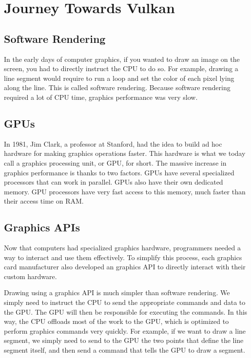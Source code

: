 \chapter{Journey Towards Vulkan}

\section{Software Rendering}

In the early days of computer graphics, if you wanted to draw an image on the
screen, you had to directly instruct the CPU to do so.
For example, drawing a line segment would require to run a loop and set the
color of each pixel lying along the line.
This is called software rendering.
Because software rendering required a lot of CPU time, graphics performance
was very slow.

\section{GPUs}

In 1981, Jim Clark, a professor at Stanford, had the idea to build
ad hoc hardware for making graphics operations faster.
This hardware is what we today call a graphics processing unit, or
GPU, for short.
The massive increase in graphics performance is thanks to two factors.
GPUs have several specialized processors that can work in parallel.
GPUs also have their own dedicated memory.
GPU processors have very fast access to this memory, much faster than
their access time on RAM.

\section{Graphics APIs}

Now that computers had specialized graphics hardware, programmers
needed a way to interact and use them effectively.
To simplify this process, each graphics card manufacturer also developed
an graphics API to directly interact with their custom hardware.

Drawing using a graphics API is much simpler than software rendering.
We simply need to instruct the CPU to send the appropriate commands and data
to the GPU.
The GPU will then be responsible for executing the commands.
In this way, the CPU offloads most of the work to the GPU, which is optimized
to perform graphics commands very quickly.
For example, if we want to draw a line segment, we simply need to send to the
GPU the two points that define the line segment itself, and then send a
command that tells the GPU to draw a segment.

